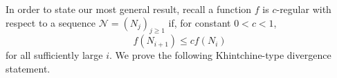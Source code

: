 \documentclass{amsart}
\newtheorem{theorem}{Theorem}[section]
\theoremstyle{definition}
\newcommand{\N}{\mathbb N}%
\newcommand{\R}{\mathbb R}
\newcommand{\0}{\mbf 0}%
\newcommand{\cN}{{\mathcal N}}
\renewcommand{\text}{\textup}
\def\N{\mathbb N}
\def\R{\mathbb R}
\begin{document}
In order to state our most general result, recall a function $f$ is $c$-regular with respect to a sequence $\cN=(N_j)_{j\geq 1}$ if, for constant $0<c<1$,
\begin{equation*} 
f(N_{i+1}) \leq c f(N_{i})
\end{equation*}
for all sufficiently large $i$. We prove the following Khintchine-type divergence statement.

\end{document}
